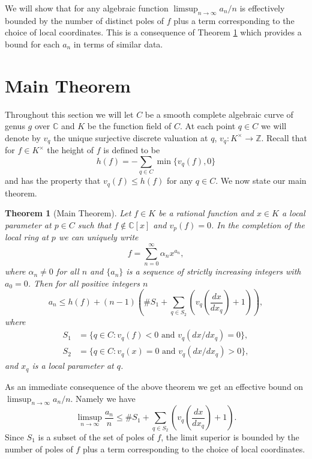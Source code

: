 \documentclass{amsart}
\newtheorem{theorem}{Theorem}[section]
\theoremstyle{definition}
\theoremstyle{remark}
\numberwithin{equation}{section}
\begin{document}
We will show that for any algebraic function $\limsup_{n\rightarrow \infty} a_n/n$ is effectively bounded by the number of distinct poles of $f$ plus a term corresponding to the choice of local coordinates. This is a consequence of Theorem \ref{theorem.main} which provides a bound for each $a_n$ in terms of similar data.

\section{Main Theorem}

Throughout this section we will let $C$ be a smooth complete algebraic curve of genus $g$ over $\mathbb{C}$ and $K$ be the function field of $C$. At each point $q\in C$ we will denote by $v_q$ the unique surjective discrete valuation at $q$, $v_q: K^\times\rightarrow \mathbb{Z}$. Recall that for $f\in K^\times$ the height of $f$ is defined to be
\[
h(f) = -\sum_{q\in C}\min\{v_q(f), 0\}
\]
and has the property that $v_q(f) \leq h(f)$ for any $q\in C$. We now state our main theorem.

\begin{theorem}[Main Theorem]\label{theorem.main}
Let $f\in K$ be a rational function and $x\in K$ a local parameter at $p\in C$ such that $f\notin \mathbb{C}[x]$ and $v_p(f) = 0$. In the completion of the local ring at $p$ we can uniquely write
\[
f = \sum_{n=0}^\infty \alpha_n x^{a_n},
\]
where $\alpha_n \neq 0$ for all $n$ and $\{a_n\}$ is a sequence of strictly increasing integers with $a_0 = 0$. Then for all positive integers $n$
\begin{equation}\label{inequality.main}
a_n \leq h(f)+(n-1)\left(\#S_1 + \sum_{q\in S_2}\left(v_q\left(\frac{dx}{dx_q}\right)+1\right)\right),
\end{equation}
where
\begin{align*}
S_1 &= \{q\in C : v_q(f) < 0 \text{ and } v_q(dx/dx_q) = 0\},\\
S_2 &= \{q\in C : v_q(x)=0\text{ and } v_q(dx/dx_q) > 0\},
\end{align*}
and $x_q$ is a local parameter at $q$.
\end{theorem}

As an immediate consequence of the above theorem we get an effective bound on $\limsup_{n\rightarrow \infty} a_n/n$. Namely we have
\[
\limsup_{n\rightarrow \infty} \frac{a_n}{n} \leq \#S_1 + \sum_{q\in S_2}\left(v_q\left(\frac{dx}{dx_q}\right)+1\right).
\]
Since $S_1$ is a subset of the set of poles of $f$, the limit superior is bounded by the number of poles of $f$ plus a term corresponding to the choice of local coordinates.
\end{document}
